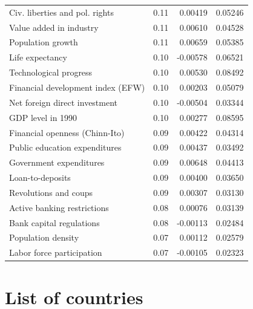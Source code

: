 \begin{refsection}
\begin{subappendices}
\begin{table}[!ht]
\begin{tabular}{lrrr}
      Civ. liberties and pol. rights & 0.11 & 0.00419 & 0.05246 \\ 
      Value added in industry & 0.11 & 0.00610 & 0.04528 \\ 
      Population growth & 0.11 & 0.00659 & 0.05385 \\ 
      Life expectancy & 0.10 & -0.00578 & 0.06521 \\ 
      Technological progress & 0.10 & 0.00530 & 0.08492 \\ 
      Financial development index (EFW) & 0.10 & 0.00203 & 0.05079 \\ 
      Net foreign direct investment & 0.10 & -0.00504 & 0.03344 \\ 
      GDP level in 1990 & 0.10 & 0.00277 & 0.08595 \\ 
      Financial openness (Chinn-Ito) & 0.09 & 0.00422 & 0.04314 \\ 
      Public education expenditures & 0.09 & 0.00437 & 0.03492 \\ 
      Government expenditures & 0.09 & 0.00648 & 0.04413 \\ 
      Loan-to-deposits & 0.09 & 0.00400 & 0.03650 \\ 
      Revolutions and coups & 0.09 & 0.00307 & 0.03130 \\ 
      Active banking restrictions & 0.08 & 0.00076 & 0.03139 \\ 
      Bank capital regulations & 0.08 & -0.00113 & 0.02484 \\ 
      Population density & 0.07 & 0.00112 & 0.02579 \\ 
      Labor force participation & 0.07 & -0.00105 & 0.02323 \\ 
      \midrule
      \bottomrule
    \end{tabular}
    \end{table}
    
    \clearpage
    \section{List of countries}
    

\end{subappendices}
\end{refsection}
